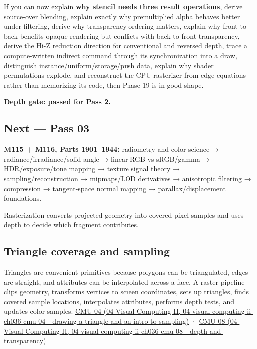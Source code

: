 If you can now explain \textbf{why stencil needs three result operations}, derive source-over blending, explain exactly why premultiplied alpha behaves better under filtering, derive why transparency ordering matters, explain why front-to-back benefits opaque rendering but conflicts with back-to-front transparency, derive the Hi-Z reduction direction for conventional and reversed depth, trace a compute-written indirect command through its synchronization into a draw, distinguish instance/uniform/storage/push data, explain why shader permutations explode, and reconstruct the CPU rasterizer from edge equations rather than memorizing its code, then Phase 19 is in good shape.

\textbf{Depth gate: passed for Pass 2.}

\subsection{Next --- Pass 03}\label{03-visual-computing-i-ch015-next-pass-03}

\textbf{M115 + M116, Parts 1901--1944:} radiometry and color science → radiance/irradiance/solid angle → linear RGB vs sRGB/gamma → HDR/exposure/tone mapping → texture signal theory → sampling/reconstruction → mipmaps/LOD derivatives → anisotropic filtering → compression → tangent-space normal mapping → parallax/displacement foundations.

Rasterization converts projected geometry into covered pixel samples and uses depth to decide which fragment contributes.

\subsection{Triangle coverage and sampling}\label{03-visual-computing-i-ch015-triangle-coverage-and-sampling}

Triangles are convenient primitives because polygons can be triangulated, edges are straight, and attributes can be interpolated across a face. A raster pipeline clips geometry, transforms vertices to screen coordinates, sets up triangles, finds covered sample locations, interpolates attributes, performs depth tests, and updates color samples. \href{../04-Visual-Computing-II/main.pdf\#nameddest=04-visual-computing-ii-ch036-cmu-04---drawing-a-triangle-and-an-intro-to-sampling}{CMU-04 (04-Visual-Computing-II, 04-visual-computing-ii-ch036-cmu-04-\/-\/-drawing-a-triangle-and-an-intro-to-sampling)} · \href{../04-Visual-Computing-II/main.pdf\#nameddest=04-visual-computing-ii-ch036-cmu-08---depth-and-transparency}{CMU-08 (04-Visual-Computing-II, 04-visual-computing-ii-ch036-cmu-08-\/-\/-depth-and-transparency)}

